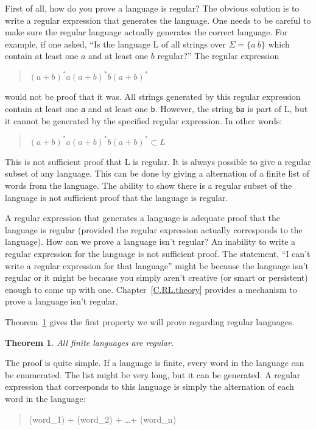 \documentclass[letterpaper,12pt,openany,reqno]{book}%
\newcommand{\code}[1] {\lstinline[breaklines=yes,breakatwhitespace=yes]{#1}}
\newtheorem{theorem}{Theorem}
\begin{document}
First of all, how do you prove a language is regular? The obvious solution is to write a regular expression that generates the language. One needs to be careful to make sure the regular language actually generates the correct language. For example, if one asked, ``Is the language L of all strings over $\Sigma = \{a\ b\}$ which contain at least one $a$ and at least one $b$ regular?''
The regular expression
\begin{quote}
$(a+b)^*a(a+b)^*b(a+b)^*$
\end{quote}
would not be proof that it was. All strings generated by this regular expression contain at least one \code{a} and at least one \code{b}. However, the string \code{ba} is part of L, but it cannot be generated by the specified regular expression. In other words:
\begin{quote}
$(a+b)^*a(a+b)^*b(a+b)^* \subset L$
\end{quote}

This is not sufficient proof that L is regular. It is always possible to give a regular subset of any language. This can be done by giving a alternation of a finite list of words from the language. The ability to show there is a regular subset of the language is not sufficient proof that the language is regular.

A regular expression that generates a language is adequate proof that the language is regular (provided the regular expression actually corresponds to the language). How can we prove a language isn't regular? An inability to write a regular expression for the language is not sufficient proof. The statement, ``I can't write a regular expression for that language'' might be because the language isn't regular or it might be because you simply aren't creative (or smart or persistent) enough to come up with one. Chapter~\ref{C.RL.theory} provides a mechanism to prove a language isn't regular. 

Theorem~\ref{TH.finite.languages} gives the first property we will prove regarding regular languages.
\begin{theorem}
\label{TH.finite.languages}
All finite languages are regular.
\end{theorem}

The proof is quite simple. If a language is finite, every word in the language can be enumerated. The list might be very long, but it can be generated. A regular expression that corresponds to this language is simply the alternation of each word in the language:
\begin{quote}
(word\_1) + (word\_2) + \dots + (word\_n)
\end{quote}
\end{document}
